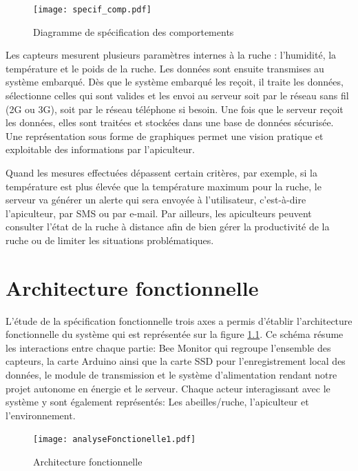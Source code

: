 \begin{figure}[h!]
\centering\texttt{[image: specif\_comp.pdf]}
\caption{\label{fig:sp_comp} Diagramme de spécification des comportements}
\end{figure}

Les capteurs mesurent plusieurs paramètres internes à la ruche : l'humidité, la température et le poids de la ruche. Les données sont ensuite transmises au système embarqué. Dès que le système embarqué les reçoit, il traite les données, sélectionne celles qui sont valides et les envoi au serveur soit par le réseau sans fil (2G ou 3G), soit par le réseau téléphone si besoin. Une fois que le serveur reçoit les données, elles sont traitées et stockées dans une base de données sécurisée. Une représentation sous forme de graphiques permet une vision pratique et exploitable des informations par l'apiculteur.

Quand les mesures effectuées dépassent certain critères, par exemple, si la température est plus élevée que la température maximum pour la ruche, le serveur va générer un alerte qui sera envoyée à l'utilisateur, c’est-à-dire l'apiculteur, par SMS ou par e-mail. Par ailleurs, les apiculteurs peuvent consulter l’état de la ruche à distance afin de bien gérer la productivité de la ruche ou de limiter les situations problématiques. 

\pagebreak

\chapter{Architecture fonctionnelle}

L'étude de la spécification fonctionnelle trois axes a permis d'établir l'architecture fonctionnelle du système qui est représentée sur la figure \ref{fig:anaFonc}.
Ce schéma résume les interactions entre chaque partie: Bee Monitor qui regroupe l'ensemble des capteurs, la carte Arduino ainsi que la carte SSD pour l'enregistrement local des données, le module de transmission et le système d'alimentation rendant notre projet autonome en énergie et le serveur. Chaque acteur interagissant avec le système y sont également représentés: Les abeilles/ruche, l'apiculteur et l'environnement.   
  

\begin{figure}[h]
\centering\texttt{[image: analyseFonctionelle1.pdf]}
\caption{\label{fig:anaFonc} Architecture fonctionnelle}
\end{figure}    

